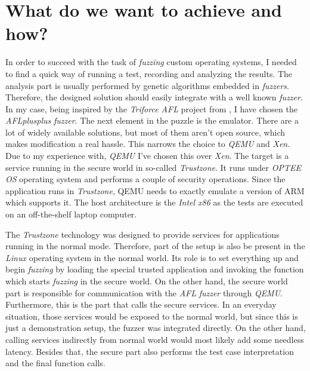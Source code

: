 \cleardoublepage
\section{What do we want to achieve and how?} \label{chap:why}
In order to succeed with the task of \textit{fuzzing} custom operating systems, I needed to find a quick way of running a test, recording and analyzing the results. The analysis part is usually performed by genetic algorithms embedded in \textit{fuzzers}. Therefore, the designed solution should easily integrate with a well known \textit{fuzzer}. In my case, being inspired by the \textit{Triforce AFL} project from \cite{triforceafl}, I have chosen the \textit{AFLplusplus} \textit{fuzzer}. The next element in the puzzle is the emulator. There are a lot of widely available solutions, but most of them aren't open source, which makes modification a real hassle. This narrows the choice to \textit{QEMU} and \textit{Xen}. Due to my experience with, \textit{QEMU} I've chosen this over \textit{Xen}. The target is a service running in the secure world in so-called \textit{Trustzone}. It runs under \textit{OPTEE OS} operating system and performs a couple of security operations. Since the application runs in \textit{Trustzone}, QEMU needs to exactly emulate a version of ARM which supports it. The host architecture is the \textit{Intel x86} as the tests are executed on an off-the-shelf laptop computer. 

The \textit{Trustzone} technology was designed to provide services for applications running in the normal mode. Therefore, part of the setup is also be present in the \textit{Linux} operating system in the normal world. Its role is to set everything up and begin \textit{fuzzing} by loading the special trusted application and invoking the function which starts \textit{fuzzing} in the secure world. On the other hand, the secure world part is responsible for communication with the \textit{AFL} \textit{fuzzer} through \textit{QEMU}. Furthermore, this is the part that calls the secure services. In an everyday situation, those services would be exposed to the normal world, but since this is just a demonstration setup, the fuzzer was integrated directly. On the other hand, calling services indirectly from normal world would most likely add some needless latency. Besides that, the secure part also performs the test case interpretation and the final function calls. 

